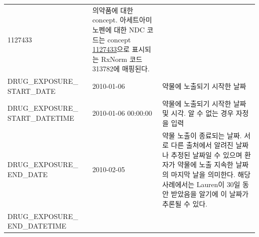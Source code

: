 \documentclass[10.5pt]{book}
\theoremstyle{definition}
\theoremstyle{definition}
\theoremstyle{definition}
\theoremstyle{remark}
\begin{document}
\begin{longtable}[]{@{}lll@{}}
\begin{minipage}[t]{0.16\columnwidth}
1127433\strut
\end{minipage} & \begin{minipage}[t]{0.48\columnwidth}\raggedright\strut
의약품에 대한 concept. 아세트아미노펜에 대한 NDC 코드는 concept
\href{http://athena.ohdsi.org/search-terms/terms/1127433}{1127433}으로
표시되는 RxNorm 코드 313782에 매핑된다.\strut
\end{minipage}\tabularnewline
\begin{minipage}[t]{0.28\columnwidth}\raggedright\strut
DRUG\_EXPOSURE\_ START\_DATE\strut
\end{minipage} & \begin{minipage}[t]{0.16\columnwidth}\raggedright\strut
2010-01-06\strut
\end{minipage} & \begin{minipage}[t]{0.48\columnwidth}\raggedright\strut
약물에 노출되기 시작한 날짜\strut
\end{minipage}\tabularnewline
\begin{minipage}[t]{0.28\columnwidth}\raggedright\strut
DRUG\_EXPOSURE\_ START\_DATETIME\strut
\end{minipage} & \begin{minipage}[t]{0.16\columnwidth}\raggedright\strut
2010-01-06 00:00:00\strut
\end{minipage} & \begin{minipage}[t]{0.48\columnwidth}\raggedright\strut
약물에 노출되기 시작한 날짜 및 시각. 알 수 없는 경우 자정을 입력\strut
\end{minipage}\tabularnewline
\begin{minipage}[t]{0.28\columnwidth}\raggedright\strut
DRUG\_EXPOSURE\_ END\_DATE\strut
\end{minipage} & \begin{minipage}[t]{0.16\columnwidth}\raggedright\strut
2010-02-05\strut
\end{minipage} & \begin{minipage}[t]{0.48\columnwidth}\raggedright\strut
약물 노출이 종료되는 날짜. 서로 다른 출처에서 알려진 날짜나 추정된
날짜일 수 있으며 환자가 약물에 노출 지속한 날짜의 마지막 날을 의미한다.
해당 사례에서는 Lauren이 30일 동안 받았음을 알기에 이 날짜가 추론될 수
있다.\strut
\end{minipage}\tabularnewline
\begin{minipage}[t]{0.28\columnwidth}\raggedright\strut
DRUG\_EXPOSURE\_ END\_DATETIME\strut
\end{minipage} & \begin{minipage}[t]{0.16\columnwidth}\raggedright\strut

\end{minipage}
\end{longtable}
\end{document}
